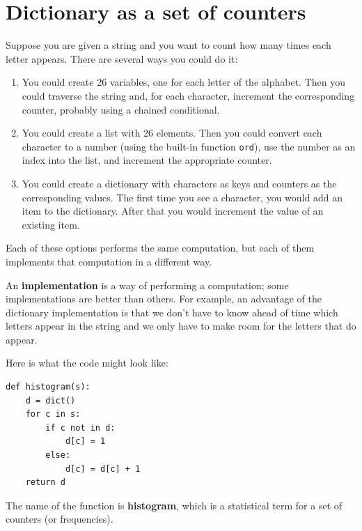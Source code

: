 \documentclass[10pt]{book}
\begin{document}
\section{Dictionary as a set of counters}
\label{histogram}


Suppose you are given a string and you want to count how many
times each letter appears.  There are several ways you could do it:

\begin{enumerate}

\item You could create 26 variables, one for each letter of the
alphabet.  Then you could traverse the string and, for each
character, increment the corresponding counter, probably using
a chained conditional.

\item You could create a list with 26 elements.  Then you could
convert each character to a number (using the built-in function
{\tt ord}), use the number as an index into the list, and increment
the appropriate counter.

\item You could create a dictionary with characters as keys
and counters as the corresponding values.  The first time you
see a character, you would add an item to the dictionary.  After
that you would increment the value of an existing item.

\end{enumerate}

Each of these options performs the same computation, but each
of them implements that computation in a different way.


An {\bf implementation} is a way of performing a computation;
some implementations are better than others.  For example,
an advantage of the dictionary implementation is that we don't
have to know ahead of time which letters appear in the string
and we only have to make room for the letters that do appear.

Here is what the code might look like:

\beforeverb
\begin{verbatim}
def histogram(s):
    d = dict()
    for c in s:
        if c not in d:
            d[c] = 1
        else:
            d[c] = d[c] + 1
    return d
\end{verbatim}
\afterverb
%
The name of the function is {\bf histogram}, which is a statistical
term for a set of counters (or frequencies).  
\end{document}
